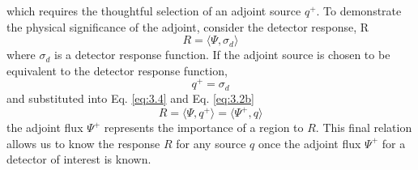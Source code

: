 which requires the thoughtful selection of an adjoint source $q^{+}$.
To demonstrate the physical significance of the adjoint, consider the
detector response, R
\begin{equation} \label{eq:3.4}
		R = \langle \Psi, \sigma_{d}\rangle 
\end{equation}
where $\sigma_{d}$ is a detector response function.
If the adjoint source is chosen to be equivalent to the detector response
function,
\begin{equation} \label{eq:3.5}
		q^{+} = \sigma_{d}
\end{equation}
and substituted into Eq. \ref{eq:3.4} and Eq. \ref{eq:3.2b} 
\begin{equation}
		R = \langle \Psi, q^{+} \rangle = \langle \Psi^{+}, q \rangle
\end{equation}
the adjoint flux $\Psi^{+}$ represents the importance of a region to
$R$.
This final relation allows us to know the response $R$ for any source $q$ once the
adjoint flux $\Psi^{+}$ for a detector of interest is known.

